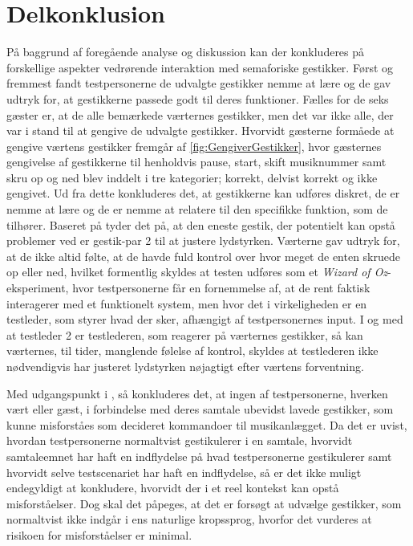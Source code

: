 \section{Delkonklusion}
\label{SocialAcceptDelkonklusion}
%
På baggrund af foregående analyse og diskussion kan der konkluderes på forskellige aspekter vedrørende interaktion med semaforiske gestikker. Først og fremmest fandt testpersonerne de udvalgte gestikker nemme at lære og de gav udtryk for, at gestikkerne passede godt til deres funktioner. Fælles for de seks gæster er, at de alle bemærkede værternes gestikker, men det var ikke alle, der var i stand til at gengive de udvalgte gestikker. Hvorvidt gæsterne formåede at gengive værtens gestikker fremgår af \autoref{fig:GengiverGestikker}, hvor gæsternes gengivelse af gestikkerne til henholdvis pause, start, skift musiknummer samt skru op og ned blev inddelt i tre kategorier; korrekt, delvist korrekt og ikke gengivet. Ud fra dette konkluderes det, at gestikkerne kan udføres diskret, de er nemme at lære og de er nemme at relatere til den specifikke funktion, som de tilhører. Baseret på  tyder det på, at den eneste gestik, der potentielt kan opstå problemer ved er gestik-par 2 til at justere lydstyrken. Værterne gav udtryk for, at de ikke altid følte, at de havde fuld kontrol over hvor meget de enten skruede op eller ned, hvilket formentlig skyldes at testen udføres som et \textit{Wizard of Oz}-eksperiment, hvor testpersonerne får en fornemmelse af, at de rent faktisk interagerer med et funktionelt system, men hvor det i virkeligheden er en testleder, som styrer hvad der sker, afhængigt af testpersonernes input. I og med at testleder 2 er testlederen, som reagerer på værternes gestikker, så kan værternes, til tider, manglende følelse af kontrol, skyldes at testlederen ikke nødvendigvis har justeret lydstyrken nøjagtigt efter værtens forventning.    

Med udgangspunkt i , så konkluderes det, at ingen af testpersonerne, hverken vært eller gæst, i forbindelse med deres samtale ubevidst lavede gestikker, som kunne misforståes som decideret kommandoer til musikanlægget. Da det er uvist, hvordan testpersonerne normaltvist gestikulerer i en samtale, hvorvidt samtaleemnet har haft en indflydelse på hvad testpersonerne gestikulerer samt hvorvidt selve testscenariet har haft en indflydelse, så er det ikke muligt endegyldigt at konkludere, hvorvidt der i et reel kontekst kan opstå misforståelser. Dog skal det påpeges, at det er forsøgt at udvælge gestikker, som normaltvist ikke indgår i ens naturlige kropssprog, hvorfor det vurderes at risikoen for misforståelser er minimal.   

